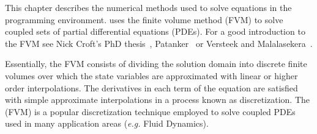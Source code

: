 This chapter describes the numerical methods used to solve equations
in the \FiPy{} programming environment. \FiPy{} uses the finite volume
method (FVM) to solve coupled sets of partial differential equations
(PDEs). For a good introduction to the FVM see
Nick Croft's PhD thesis~\cite{croftphd}, Patanker~\cite{patanker} or Versteek and
Malalasekera~\cite{versteegMalalasekera}.

Essentially, the FVM consists of dividing the solution domain into
discrete finite volumes over which the state variables are
approximated with linear or higher order interpolations. The
derivatives in each term of the equation are satisfied with simple
approximate interpolations in a process known as discretization. The
(FVM) is a popular discretization technique employed to solve coupled
PDEs used in many application areas (\emph{e.g.} Fluid Dynamics).






